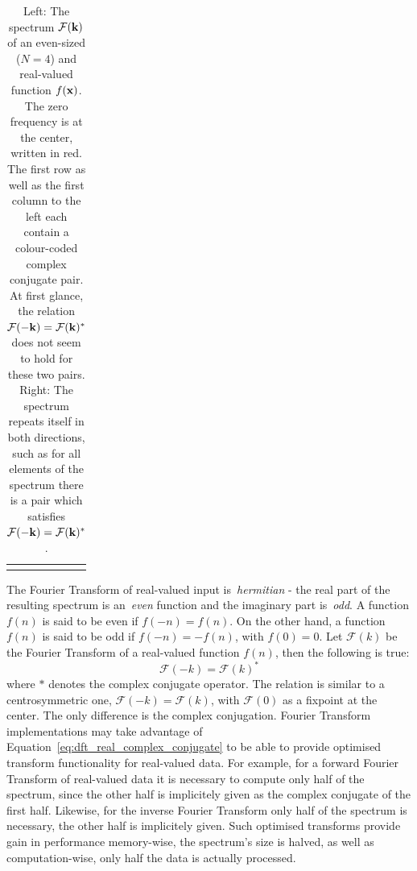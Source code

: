 \begin{table}
{\begin{tabular}{S|SSS|S}
\hline
{}     & {}                       &                        & {}                       & {} \\
\end{tabular}
}
\caption{Left: The spectrum $\mathcal{F}(\mathbf{k})$ of an even-sized ($N = 4$) and real-valued function $f(\mathbf{x})$.
The zero frequency is at the center, written in red. The first row as well as the first column to the
left each contain a colour-coded complex conjugate pair. At first glance, the relation 
$\mathcal{F}(-\mathbf{k})=\mathcal{F}(\mathbf{k})^*$ does not seem to hold for these two pairs.
Right: The spectrum repeats itself in both directions, such as for all elements of the spectrum
there is a pair which satisfies $\mathcal{F}(-\mathbf{k})=\mathcal{F}(\mathbf{k})^*$.}
\label{tab:spectrum_k_minusk_border}
\end{table}
%
The Fourier Transform of real-valued input is~\emph{hermitian} - the real part of the resulting spectrum
is an~\emph{even} function and the imaginary part is~\emph{odd}. A function $f(n)$ is said to be even if
$f(-n) = f(n)$. On the other hand, a function $f(n)$ is said to be odd if $f(-n) = -f(n)$,
with $f(0) = 0$. Let $\mathcal{F}(k)$ be the Fourier Transform of a real-valued function $f(n)$, then
the following is true:
\begin{equation}
\label{eq:dft_real_complex_conjugate}
 \mathcal{F}(-k) = \mathcal{F}(k)^*
\end{equation}
where $*$ denotes the complex conjugate operator. The relation is similar to a centrosymmetric one,
$\mathcal{F}(-k) = \mathcal{F}(k)$, with $\mathcal{F}(0)$ as a fixpoint at the center. The only
difference is the complex conjugation. Fourier Transform implementations may take advantage of
Equation~\ref{eq:dft_real_complex_conjugate} to be able to provide optimised transform functionality 
for real-valued data. For example, for a forward Fourier Transform of real-valued data it is
necessary to compute only half of the spectrum, since the other half is implicitely given as the
complex conjugate of the first half. Likewise, for the inverse Fourier Transform only half of the
spectrum is necessary, the other half is implicitely given. Such optimised transforms provide
gain in performance memory-wise, the spectrum's size is halved, as well as computation-wise, only
half the data is actually processed.\\


